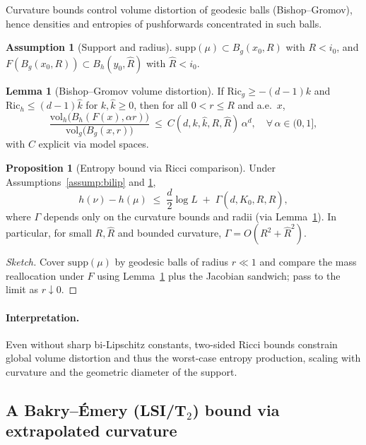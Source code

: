 \documentclass{article}
\theoremstyle{definition}
\newtheorem{assumption}{Assumption}[section]
\newtheorem{lemma}[theorem]{Lemma}
\newtheorem{proposition}[theorem]{Proposition}
\begin{document}
Curvature bounds control volume distortion of geodesic balls (Bishop--Gromov),
hence densities and entropies of pushforwards concentrated in such balls.

\begin{assumption}[Support and radius]
\label{assump:support}
\(\mathrm{supp}(\mu)\subset B_g(x_0,R)\) with \(R<i_0\), and
\(F(B_g(x_0,R))\subset B_h(y_0,\widehat R)\) with \(\widehat R<i_0\).
\end{assumption}

\begin{lemma}[Bishop--Gromov volume distortion]
\label{lem:BG}
If \(\mathrm{Ric}_g\ge -(d-1)k\) and \(\mathrm{Ric}_h\le (d-1)\widehat k\) for \(k,\widehat k\ge 0\),
then for all \(0<r\le R\) and a.e.\ \(x\),
\[
\frac{\mathrm{vol}_h\big(B_h(F(x),\alpha r)\big)}{\mathrm{vol}_g\big(B_g(x,r)\big)}
\ \le\ C(d,k,\widehat k,R,\widehat R)\,\alpha^d,
\quad \forall\,\alpha\in(0,1],
\]
with \(C\) explicit via model spaces.
\end{lemma}

\begin{proposition}[Entropy bound via Ricci comparison]
\label{prop:entropy-ricci}
Under Assumptions~\ref{assump:bilip} and \ref{assump:support},
\[
h(\nu) - h(\mu) \;\le\; \frac{d}{2}\log L \;+\; \Gamma(d,K_0,R,\widehat R),
\]
where \(\Gamma\) depends only on the curvature bounds and radii (via
Lemma~\ref{lem:BG}). In particular, for small \(R,\widehat R\) and bounded
curvature, \(\Gamma = O(R^2+\widehat R^2)\).
\end{proposition}

\begin{proof}[Sketch]
Cover \(\mathrm{supp}(\mu)\) by geodesic balls of radius \(r\ll 1\) and compare the
mass reallocation under \(F\) using Lemma~\ref{lem:BG} plus the Jacobian
sandwich; pass to the limit as \(r\downarrow 0\).
\end{proof}

\paragraph{Interpretation.}
Even without sharp bi-Lipschitz constants, two-sided Ricci bounds constrain
global volume distortion and thus the worst-case entropy production, scaling
with curvature and the geometric diameter of the support.

\subsection{A Bakry--\'Emery (LSI/T\(_2\)) bound via extrapolated curvature}
\end{document}
